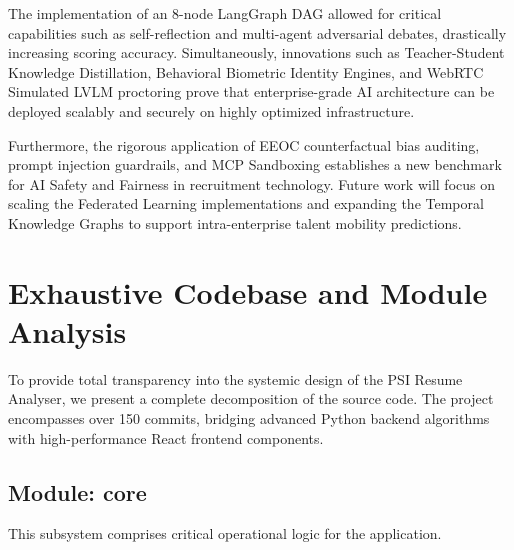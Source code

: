 \documentclass[10pt,journal,compsoc]{IEEEtran}
\begin{document}
The implementation of an 8-node LangGraph DAG allowed for critical capabilities such as self-reflection and multi-agent adversarial debates, drastically increasing scoring accuracy. Simultaneously, innovations such as Teacher-Student Knowledge Distillation, Behavioral Biometric Identity Engines, and WebRTC Simulated LVLM proctoring prove that enterprise-grade AI architecture can be deployed scalably and securely on highly optimized infrastructure.

Furthermore, the rigorous application of EEOC counterfactual bias auditing, prompt injection guardrails, and MCP Sandboxing establishes a new benchmark for AI Safety and Fairness in recruitment technology. Future work will focus on scaling the Federated Learning implementations and expanding the Temporal Knowledge Graphs to support intra-enterprise talent mobility predictions.



\section{Exhaustive Codebase and Module Analysis}\label{sec:exhaustive_analysis}
To provide total transparency into the systemic design of the PSI Resume Analyser, we present a complete decomposition of the source code. The project encompasses over 150 commits, bridging advanced Python backend algorithms with high-performance React frontend components.
\subsection{Module: core}
This subsystem comprises critical operational logic for the application.
\end{document}
